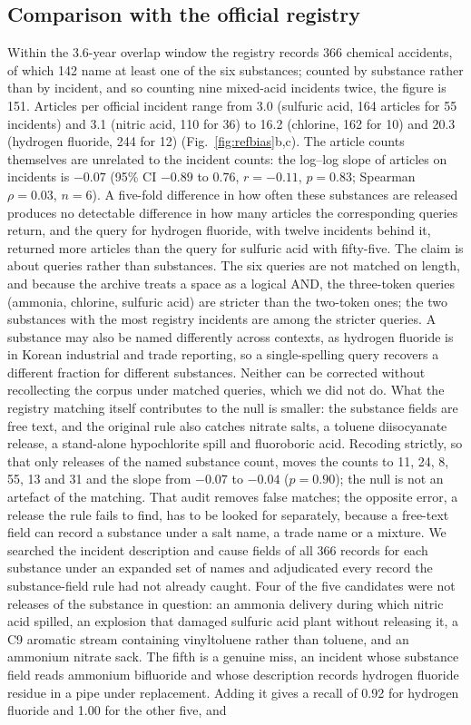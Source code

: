 \documentclass[1p,times]{elsarticle}
\begin{document}
\subsection{Comparison with the official registry}
\label{sec:registry}
Within the 3.6-year overlap window the registry records 366 chemical accidents, of which 142 name at least one of the six substances; counted by substance rather than by incident, and so counting nine mixed-acid incidents twice, the figure is 151. Articles per official incident range from 3.0 (sulfuric acid, 164 articles for 55 incidents) and 3.1 (nitric acid, 110 for 36) to 16.2 (chlorine, 162 for 10) and 20.3 (hydrogen fluoride, 244 for 12) (Fig.~\ref{fig:refbias}b,c). The article counts themselves are unrelated to the incident counts: the log--log slope of articles on incidents is $-0.07$ (95\% CI $-0.89$ to $0.76$, $r = -0.11$, $p = 0.83$; Spearman $\rho = 0.03$, $n = 6$). A five-fold difference in how often these substances are released produces no detectable difference in how many articles the corresponding queries return, and the query for hydrogen fluoride, with twelve incidents behind it, returned more articles than the query for sulfuric acid with fifty-five. The claim is about queries rather than substances. The six queries are not matched on length, and because the archive treats a space as a logical AND, the three-token queries (ammonia, chlorine, sulfuric acid) are stricter than the two-token ones; the two substances with the most registry incidents are among the stricter queries. A substance may also be named differently across contexts, as hydrogen fluoride is in Korean industrial and trade reporting, so a single-spelling query recovers a different fraction for different substances. Neither can be corrected without recollecting the corpus under matched queries, which we did not do. What the registry matching itself contributes to the null is smaller: the substance fields are free text, and the original rule also catches nitrate salts, a toluene diisocyanate release, a stand-alone hypochlorite spill and fluoroboric acid. Recoding strictly, so that only releases of the named substance count, moves the counts to 11, 24, 8, 55, 13 and 31 and the slope from $-0.07$ to $-0.04$ ($p = 0.90$); the null is not an artefact of the matching. That audit removes false matches; the opposite error, a release the rule fails to find, has to be looked for separately, because a free-text field can record a substance under a salt name, a trade name or a mixture. We searched the incident description and cause fields of all 366 records for each substance under an expanded set of names and adjudicated every record the substance-field rule had not already caught. Four of the five candidates were not releases of the substance in question: an ammonia delivery during which nitric acid spilled, an explosion that damaged sulfuric acid plant without releasing it, a C9 aromatic stream containing vinyltoluene rather than toluene, and an ammonium nitrate sack. The fifth is a genuine miss, an incident whose substance field reads ammonium bifluoride and whose description records hydrogen fluoride residue in a pipe under replacement. Adding it gives a recall of 0.92 for hydrogen fluoride and 1.00 for the other five, and 
\end{document}
